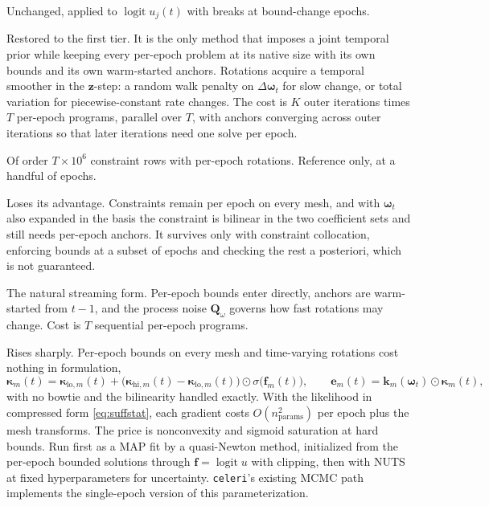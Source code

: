 \documentclass[11pt]{article}
\newcommand{\vect}[1]{\bm{#1}}
\newcommand{\mat}[1]{\mathbf{#1}}
\newcommand{\code}[1]{\texttt{#1}}
\DeclareMathOperator{\logit}{logit}
\begin{document}
\begin{description}[style=nextline,nosep,leftmargin=1.5em]
\item[Approach 1, post-hoc fusion.] Unchanged, applied to $\logit u_j(t)$ with breaks at bound-change epochs.
\item[Approach 2, consensus ADMM.] Restored to the first tier. It is the only method that imposes a joint temporal prior while keeping every per-epoch problem at its native size with its own bounds and its own warm-started anchors. Rotations acquire a temporal smoother in the $\vect{z}$-step: a random walk penalty on $\Delta\vect{\omega}_t$ for slow change, or total variation for piecewise-constant rate changes. The cost is $K$ outer iterations times $T$ per-epoch programs, parallel over $T$, with anchors converging across outer iterations so that later iterations need one solve per epoch.
\item[Approach 3, joint program.] Of order $T \times 10^6$ constraint rows with per-epoch rotations. Reference only, at a handful of epochs.
\item[Approach 4, low-rank temporal basis.] Loses its advantage. Constraints remain per epoch on every mesh, and with $\vect{\omega}_t$ also expanded in the basis the constraint is bilinear in the two coefficient sets and still needs per-epoch anchors. It survives only with constraint collocation, enforcing bounds at a subset of epochs and checking the rest a posteriori, which is not guaranteed.
\item[Approach 5, constrained filter.] The natural streaming form. Per-epoch bounds enter directly, anchors are warm-started from $t-1$, and the process noise $\mat{Q}_\omega$ governs how fast rotations may change. Cost is $T$ sequential per-epoch programs.
\item[Approach 6, transform-based.] Rises sharply. Per-epoch bounds on every mesh and time-varying rotations cost nothing in formulation,
\begin{equation}
\vect{\kappa}_m(t) = \vect{\kappa}_{\mathrm{lo},m}(t) + \bigl(\vect{\kappa}_{\mathrm{hi},m}(t) - \vect{\kappa}_{\mathrm{lo},m}(t)\bigr) \odot \sigma\!\bigl(\vect{f}_m(t)\bigr), \qquad
\vect{e}_m(t) = \vect{k}_m(\vect{\omega}_t) \odot \vect{\kappa}_m(t),
\end{equation}
with no bowtie and the bilinearity handled exactly. With the likelihood in compressed form \eqref{eq:suffstat}, each gradient costs $O(n_{\mathrm{params}}^2)$ per epoch plus the mesh transforms. The price is nonconvexity and sigmoid saturation at hard bounds. Run first as a MAP fit by a quasi-Newton method, initialized from the per-epoch bounded solutions through $\vect{f} = \logit u$ with clipping, then with NUTS at fixed hyperparameters for uncertainty. \code{celeri}'s existing MCMC path implements the single-epoch version of this parameterization.
\end{description}
\end{document}
